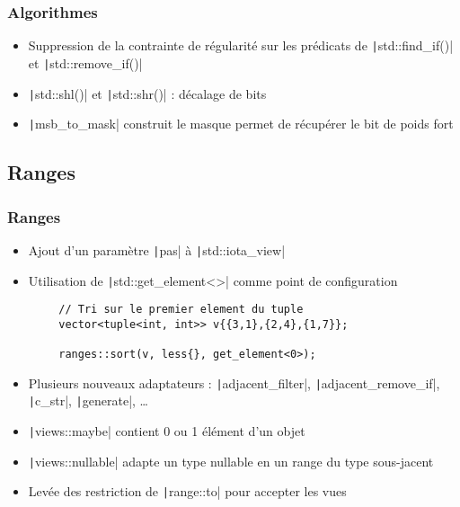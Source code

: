 \documentclass[C++.tex]{subfiles}
\begin{document}
\begin{frame}[fragile]
	\frametitle{Algorithmes}
	\begin{itemize}
		\item Suppression de la contrainte de régularité sur les prédicats de \texttt|std::find_if()| et \texttt|std::remove_if()|


		\item \texttt|std::shl()| et \texttt|std::shr()| : décalage de bits
		\item \texttt|msb_to_mask| construit le masque permet de récupérer le bit de poids fort
	\end{itemize}

\end{frame}

\subsection*{Ranges}
\begin{frame}[fragile]
	\frametitle{Ranges}
	\begin{itemize}
		\item Ajout d'un paramètre \texttt|pas| à \texttt|std::iota_view|
		\item Utilisation de \texttt|std::get_element<>| comme point de configuration
	\end{itemize}

	\begin{verbatim}
		// Tri sur le premier element du tuple
		vector<tuple<int, int>> v{{3,1},{2,4},{1,7}};

		ranges::sort(v, less{}, get_element<0>);
	\end{verbatim}

	\begin{itemize}
		\item Plusieurs nouveaux adaptateurs : \texttt|adjacent_filter|, \texttt|adjacent_remove_if|, \texttt|c_str|, \texttt|generate|, \ldots
		\item \texttt|views::maybe| contient 0 ou 1 élément d'un objet
		\item \texttt|views::nullable| adapte un type nullable en un range du type sous-jacent
		\item Levée des restriction de \texttt|range::to| pour accepter les vues
	\end{itemize}

\end{frame}
\end{document}
